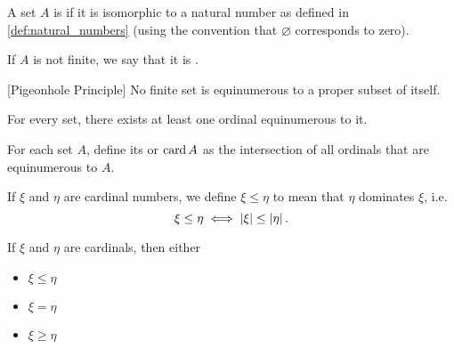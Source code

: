 \begin{definition}\label{def:finite_set}\cite[133]{Enderton1977}
  A set \( A \) is  if it is isomorphic to a natural number as defined in \cref{def:natural_numbers} (using the convention that \( \varnothing \) corresponds to zero).

  If \( A \) is not finite, we say that it is .
\end{definition}

\begin{theorem}\label{def:pigeonhole_principle}[Pigeonhole Principle]\cite[Corollary 6C]{Enderton1977}
  No finite set is equinumerous to a proper subset of itself.
\end{theorem}

\begin{theorem}\label{thm:equinumerous_ordinal_existence}\cite[197]{Enderton1977}
  For every set, there exists at least one ordinal equinumerous to it.
\end{theorem}

\begin{definition}\label{def:cardinal}\cite[197]{Enderton1977}
  For each set \( A \), define its  or  \( \operatorname{card} A \) as the intersection of all ordinals that are equinumerous to \( A \).

  If \( \xi \) and \( \eta \) are cardinal numbers, we define \( \xi \leq \eta \) to mean that \( \eta \) dominates \( \xi \), i.e.
  \begin{equation*}
    \xi \leq \eta \iff \left\vert \xi \right\vert \leq \left\vert \eta \right\vert.
  \end{equation*}
\end{definition}

\begin{theorem}\label{thm:cardinal_trichotomy}\cite[theorem 6M(5)]{Enderton1977}
  If \( \xi \) and \( \eta \) are cardinals, then either
  \begin{itemize}
    \item \( \xi \leq \eta \)
    \item \( \xi = \eta \)
    \item \( \xi \geq \eta \)
  \end{itemize}
\end{theorem}

